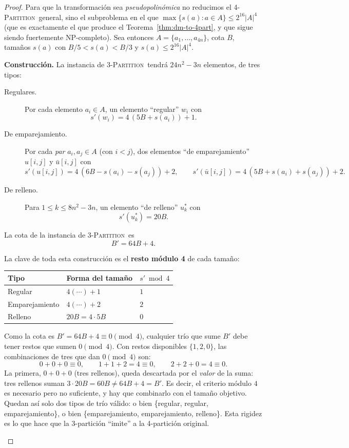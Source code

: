 \documentclass[12pt,a4paper]{article}
\theoremstyle{definition}
\theoremstyle{remark}
\newcommand{\TPART}{\textsc{3-Partition}}
\newcommand{\FPART}{\textsc{4-Partition}}
\begin{document}
\begin{proof}
Para que la transformación sea \emph{pseudopolinómica} no reducimos el \FPART\
general, sino el subproblema en el que $\max\{s(a): a \in A\} \leq 2^{16} |A|^4$
(que es exactamente el que produce el Teorema~\ref{thm:dm-to-4part}, y que sigue
siendo fuertemente NP-completo). Sea entonces
$A = \{a_1, \ldots, a_{4n}\}$, cota $B$, tamaños $s(a)$ con
$B/5 < s(a) < B/3$ y $s(a) \leq 2^{16} |A|^4$.

\medskip
\noindent\textbf{Construcción.}
La instancia de \TPART\ tendrá $24n^2 - 3n$ elementos, de tres tipos:

\begin{description}
  \item[Regulares.] Por cada elemento $a_i \in A$, un elemento ``regular'' $w_i$ con
  \[
    s'(w_i) = 4\,(5B + s(a_i)) + 1.
  \]
  \item[De emparejamiento.] Por cada \emph{par} $a_i, a_j \in A$ (con $i<j$), dos
  elementos ``de emparejamiento'' $u[i,j]$ y $\bar u[i,j]$ con
  \[
    s'(u[i,j]) = 4\,(6B - s(a_i) - s(a_j)) + 2,
    \qquad
    s'(\bar u[i,j]) = 4\,(5B + s(a_i) + s(a_j)) + 2.
  \]
  \item[De relleno.] Para $1 \leq k \leq 8n^2 - 3n$, un elemento ``de relleno''
  $u_k^*$ con
  \[
    s'(u_k^*) = 20B.
  \]
\end{description}
La cota de la instancia de \TPART\ es
\[
  B' = 64B + 4.
\]

\begin{intuicion}
La clave de toda esta construcción es el \textbf{resto módulo 4} de cada tamaño:
\begin{center}
\begin{tabular}{lll}
\toprule
Tipo & Forma del tamaño & $s' \bmod 4$ \\
\midrule
Regular        & $4(\cdots)+1$ & $1$ \\
Emparejamiento & $4(\cdots)+2$ & $2$ \\
Relleno        & $20B = 4\cdot 5B$ & $0$ \\
\bottomrule
\end{tabular}
\end{center}
Como la cota es $B' = 64B+4 \equiv 0 \pmod 4$, cualquier trío que sume $B'$ debe
tener restos que sumen $0 \pmod 4$. Con restos disponibles $\{1, 2, 0\}$, las
combinaciones de tres que dan $0 \pmod 4$ son:
\[
  0+0+0 \equiv 0, \qquad 1+1+2 = 4 \equiv 0, \qquad 2+2+0 = 4 \equiv 0.
\]
La primera, $0+0+0$ (tres rellenos), queda descartada por el \emph{valor} de la
suma: tres rellenos suman $3 \cdot 20B = 60B \neq 64B + 4 = B'$. Es decir, el
criterio módulo $4$ es necesario pero no suficiente, y hay que combinarlo con el
tamaño objetivo. Quedan así solo dos tipos de trío válido: o bien
\{regular, regular, emparejamiento\}, o bien
\{emparejamiento, emparejamiento, relleno\}. Esta rigidez es lo que hace que la
3-partición ``imite'' a la 4-partición original.
\end{intuicion}


\end{proof}
\end{document}
